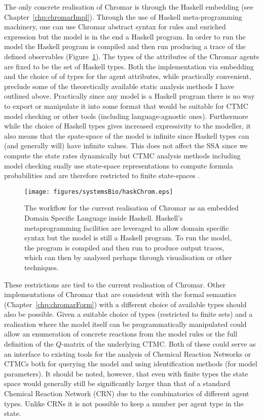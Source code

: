 The only concrete realisation of Chromar is through the Haskell embedding (see
Chapter~\ref{chp:chromarImpl}).  Through the use of Haskell meta-programming
machinery, one can use Chromar abstract syntax for rules and enriched expression
but the model is in the end a Haskell program.  In order to run the model the
Haskell program is compiled and then run producing a trace of the defined
observables (Figure~\ref{fig:haskChrom}). The types of the attributes of the
Chromar agents are fixed to be the set of Haskell types. Both the implementation
via embedding and the choice of of types for the agent attributes, while
practically convenient, preclude some of the theoretically available static
analysis methods I have outlined above. Practically since any model is a Haskell
program there is no way to export or manipulate it into some format that would
be suitable for CTMC model checking or other tools (including language-agnostic
ones). Furthermore while the choice of Haskell types gives increased
expressivity to the modeller, it also means that the spate-space of the model is
infinite since Haskell types can (and generally will) have infinite values. This
does not affect the SSA since we compute the state rates dynamically but CTMC
analysis methods including model checking sually use state-space representations
to compute formula probabilities and are therefore restricted to finite
state-spaces \citep[see for example the PRISM
tool;][]{Kwiatkowska_Norman_Parker_2011}.

\begin{figure}
    \centering
    \texttt{[image: figures/systemsBio/haskChrom.eps]}
    \caption{The workflow for the current realisation of Chromar as an embedded
      Domain Specific Language inside Haskell. Haskell's metaprogramming
      facilities are leveraged to allow domain specific syntax but the model is
      still a Haskell program. To run the model, the program is compiled and
      then run to produce output traces, which can then by analysed perhaps
      through visualisation or other techniques.}
    \label{fig:haskChrom}
\end{figure}

These restrictions are tied to the current realisation of Chromar. Other
implementations of Chromar that are consistent with the formal semantics
(Chapter~\ref{chp:chromarForm}) with a different choice of available types
should also be possible. Given a suitable choice of types (\eg restricted to
finite sets) and a realisation where the model itself can be programmatically
manipulated could allow an enumeration of concrete reactions from the model
rules or the full definition of the $Q$-matrix of the underlying CTMC. Both of
these could serve as an interface to existing tools for the analysis of Chemical
Reaction Networks or CTMCs both for querying the model and using identification
methods (\eg for model parameters). It should be noted, however, that even with
finite types the state space would generally still be significantly larger than
that of a standard Chemical Reaction Network (CRN) due to the combinatorics of
different agent types. Unlike CRNs it is not possible to keep a number per agent
type in the state.

